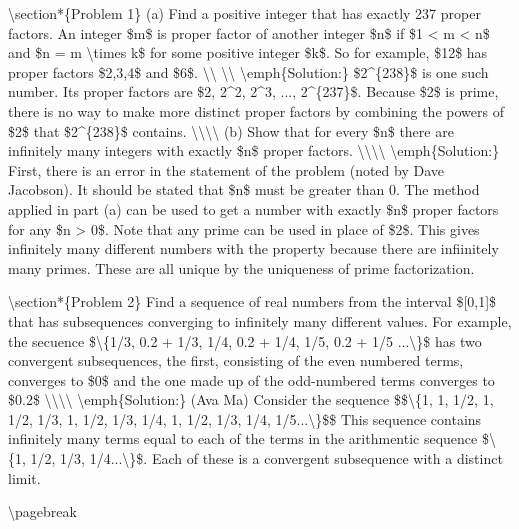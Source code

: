 \textbackslash{}section*\{Problem 1\}
(a) Find a positive integer that has exactly 237 proper factors.  An integer \$m\$ is proper factor of another integer \$n\$ if \$1 < m < n\$ and \$n = m \textbackslash{}times k\$ for some positive integer \$k\$.  So for example, \$12\$ has proper factors \$2,3,4\$ and \$6\$.
\textbackslash{}\textbackslash{} \textbackslash{}\textbackslash{}
\textbackslash{}emph\{Solution:\}  \$2\^{}\{238\}\$ is one such number.  Its proper factors are \$2, 2\^{}2, 2\^{}3, ..., 2\^{}\{237\}\$.  Because \$2\$ is prime, there is no way to make more distinct proper factors by combining the powers of \$2\$ that \$2\^{}\{238\}\$ contains.
\textbackslash{}\textbackslash{}\textbackslash{}\textbackslash{}
(b) Show that for every \$n\$ there are infinitely many integers with exactly \$n\$ proper factors.
\textbackslash{}\textbackslash{}\textbackslash{}\textbackslash{}
\textbackslash{}emph\{Solution:\} First, there is an error in the statement of the problem (noted by Dave Jacobson).  It should be stated that \$n\$ must be greater than 0.  The method applied in part (a) can be used to get a number with exactly \$n\$ proper factors for any \$n > 0\$.  Note that any prime can be used in place of \$2\$.  This gives infinitely many different numbers with the property because there are infiinitely many primes.  These are all unique by the uniqueness of prime factorization.

\textbackslash{}section*\{Problem 2\}
Find a sequence of real numbers from the interval \$[0,1]\$ that has subsequences converging to infinitely many different values.   For example, the secuence \$\textbackslash{}\{1/3, 0.2 + 1/3, 1/4, 0.2 + 1/4, 1/5, 0.2 + 1/5 ...\textbackslash{}\}\$ has two convergent subsequences, the first, consisting of the even numbered terms, converges to \$0\$ and the one made up of the odd-numbered terms converges to \$0.2\$
\textbackslash{}\textbackslash{}\textbackslash{}\textbackslash{}
\textbackslash{}emph\{Solution:\} (Ava Ma) Consider the sequence \$\$\textbackslash{}\{1, 1, 1/2, 1, 1/2, 1/3, 1, 1/2, 1/3, 1/4, 1, 1/2, 1/3, 1/4, 1/5...\textbackslash{}\}\$\$ This sequence contains infinitely many terms equal to each of  the terms in the arithmentic sequence \$\textbackslash{}\{1, 1/2, 1/3, 1/4...\textbackslash{}\}\$.  Each of these is a convergent  subsequence with a distinct limit.

\textbackslash{}pagebreak

